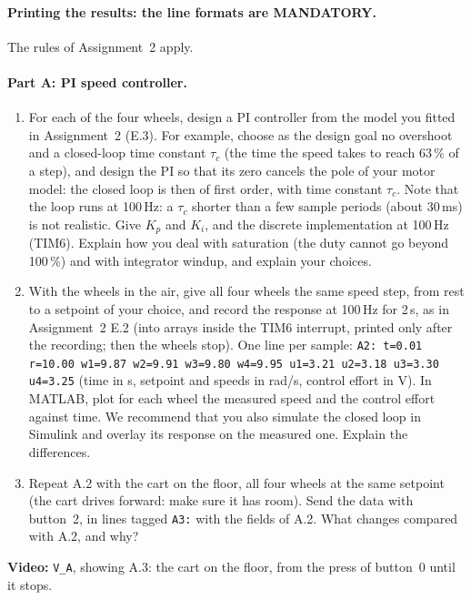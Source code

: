 \documentclass[11pt,a4paper]{article}
\begin{document}
\paragraph{Printing the results: the line formats are MANDATORY.}
The rules of Assignment~2 apply.

\paragraph{Part A: PI speed controller.}
\begin{enumerate}[label=A.\arabic*, leftmargin=2.2em]
  \item For each of the four wheels, design a PI controller from the model you fitted in Assignment~2 (E.3). For
        example, choose as the design goal no overshoot and a closed-loop time constant $\tau_c$ (the time the speed
        takes to reach 63\,\% of a step), and design the PI so that its zero cancels the pole of your motor model: the
        closed loop is then of first order, with time constant $\tau_c$. Note that the loop runs at 100\,Hz: a
        $\tau_c$ shorter than a few sample periods (about 30\,ms) is not realistic. Give $K_p$ and $K_i$, and the
        discrete implementation at 100\,Hz (TIM6). Explain how you deal with saturation (the duty cannot go beyond
        100\,\%) and with integrator windup, and explain your choices.
  \item With the wheels in the air, give all four wheels the same speed step, from rest to a setpoint of your choice,
        and record the response at 100\,Hz for 2\,s, as in Assignment~2 E.2 (into arrays inside the TIM6 interrupt,
        printed only after the recording; then the wheels stop). One line per sample:
        \texttt{A2: t=0.01 r=10.00 w1=9.87 w2=9.91 w3=9.80 w4=9.95 u1=3.21 u2=3.18 u3=3.30 u4=3.25} (time in s,
        setpoint and speeds in rad/s, control effort in V). In MATLAB, plot for each wheel the measured speed and the
        control effort against time. We recommend that you also simulate the closed loop in Simulink and overlay its
        response on the measured one. Explain the differences.
  \item Repeat A.2 with the cart on the floor, all four wheels at the same setpoint (the cart drives forward: make sure
        it has room). Send the data with button~2, in lines tagged \texttt{A3:} with the fields of A.2. What changes
        compared with A.2, and why?
\end{enumerate}

\noindent\textbf{Video:} \texttt{V\_A}, showing A.3: the cart on the floor, from the press of button~0 until it stops.
\end{document}
